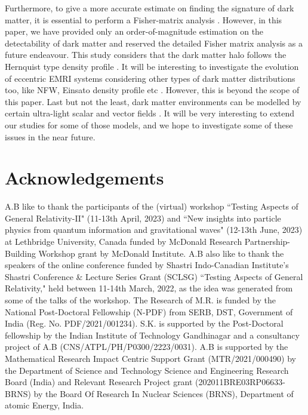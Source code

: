 \documentclass[11pt]{article}
\begin{document}
Furthermore, to give a more accurate estimate on finding the signature of dark matter, it is essential to perform a Fisher-matrix analysis \cite{Vallisneri:2007ev}. However, in this paper, we have provided only an order-of-magnitude estimation on the detectability of dark matter and reserved the detailed Fisher matrix analysis as a future endeavour.
This study considers that the dark matter halo follows the Hernquist type density profile \cite{1990ApJ...356..359H}. It will be interesting to investigate the evolution of eccentric EMRI systems considering other types of dark matter distributions too, like NFW, Einsato density profile etc \cite{Navarro:1995iw,Graham:2005xx,DeLuca:2023laa,Figueiredo:2023gas}. However, this is beyond the scope of this paper. Last but not the least, dark matter environments can be modelled by certain ultra-light scalar and vector fields \cite{Baryakhtar:2022hbu, Bhattacharyya:2023kbh, Cardoso:2018tly}. It will be very interesting to extend our studies for some of those models, and we hope to investigate some of these issues in the near future. 




\section*{Acknowledgements} 
A.B like to thank the participants of the (virtual) workshop ``Testing Aspects of  General Relativity-II" (11-13th April, 2023) and ``New insights into particle physics from quantum information and gravitational waves" (12-13th June, 2023) at Lethbridge University, Canada funded by McDonald Research Partnership-Building Workshop grant by McDonald Institute. A.B also like to thank the speakers of the online conference funded by Shastri Indo-Canadian Institute's Shastri Conference \& Lecture Series Grant (SCLSG) ``Testing Aspects of General Relativity," held between 11-14th March, 2022, as the idea was generated from some of the talks of the workshop. The Research of M.R. is funded by the National Post-Doctoral Fellowship (N-PDF) from SERB, DST, Government of India (Reg. No. PDF/2021/001234). S.K. is supported by the Post-Doctoral fellowship by the Indian Institute of Technology Gandhinagar and a consultancy project of A.B (CNS/ATPL/PH/P0300/2223/0031). A.B is supported by the Mathematical Research Impact Centric Support Grant (MTR/2021/000490) by the Department of Science and Technology Science and Engineering Research Board (India) and Relevant Research Project grant (202011BRE03RP06633-BRNS) by the Board Of Research In Nuclear Sciences (BRNS), Department of atomic Energy, India.
\end{document}
